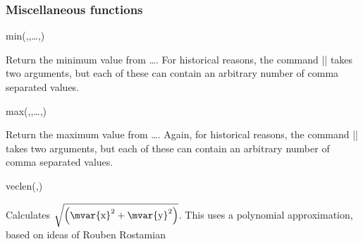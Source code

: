 \subsubsection{Miscellaneous functions}

\label{pgfmath-functions-misc}

\begin{math-function}{min(,,\ldots,)}

  Return the minimum value from \ldots{}.
  For historical reasons, the command |\pgfmathmin| takes two
  arguments, but each of these can contain an arbitrary number
  of comma separated values.

\begin{codeexample}[]
 \pgfmathresult
\end{codeexample}

\end{math-function}


\begin{math-function}{max(,,\ldots,)}

  Return the maximum value from \ldots{}.
  Again, for historical reasons, the command |\pgfmathmax| takes two
  arguments, but each of these can contain an arbitrary number
  of comma separated values.

\begin{codeexample}[]
 \pgfmathresult
\end{codeexample}

\end{math-function}


\begin{math-function}{veclen(,)}
\mathcommand

 Calculates $\sqrt{\left(\textrm{\mvar{x}}^2+\textrm{\mvar{y}}^2\right)}$.
 This uses a polynomial approximation, based on ideas of Rouben Rostamian
\begin{codeexample}[]
 \pgfmathresult
\end{codeexample}

\end{math-function}





